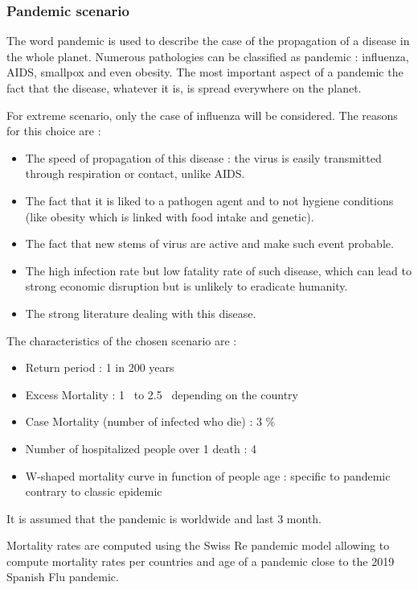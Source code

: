 


\subsubsection{Pandemic scenario}

The word pandemic is used to describe the case of the propagation of a disease in the whole planet. Numerous pathologies can be classified as pandemic : influenza, AIDS, smallpox and even obesity. The most important aspect of a pandemic the fact that the disease, whatever it is, is spread everywhere on the planet.

For extreme scenario, only the case of influenza will be considered. The reasons for this choice are :
\begin{itemize}
\item The speed of propagation of this disease : the virus is easily transmitted through respiration or contact, unlike AIDS.
\item The fact that it is liked to a pathogen agent and to not hygiene conditions (like obesity which is linked with food intake and genetic).
\item The fact that new stems of virus are active and make such event probable.
\item The high infection rate but low fatality rate of such disease, which can lead to strong economic disruption but is unlikely to eradicate humanity.
\item The strong literature dealing with this disease.
\end{itemize}

The characteristics of the chosen scenario are :

\begin{itemize}
\item Return period : 1 in 200 years
\item Excess Mortality : 1 \textperthousand\ to 2.5 \textperthousand\ depending on the country
\item Case Mortality (number of infected who die) : 3 \%
\item Number of hospitalized people over 1 death : 4
\item W-shaped mortality curve in function of people age : specific to pandemic contrary to classic epidemic
\end{itemize}

It is assumed that the pandemic is worldwide and last 3 month.

Mortality rates are computed using the Swiss Re pandemic model allowing to compute mortality rates per countries and age of a pandemic close to the 2019 Spanish Flu pandemic.

